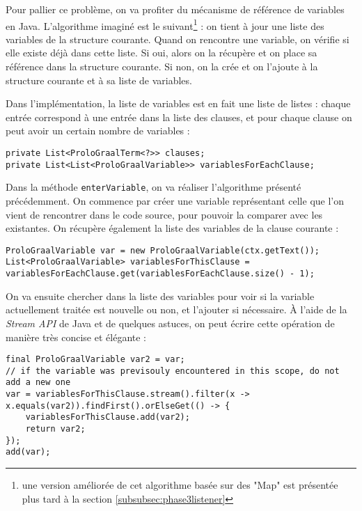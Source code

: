 \documentclass[../report.tex]{subfiles}
\begin{document}
Pour pallier ce problème, on va profiter du mécanisme de référence de variables en Java. L'algorithme imaginé est le suivant\footnote{une version améliorée de cet algorithme basée sur des "Map" est présentée plus tard à la section \ref{subsubsec:phase3listener}} : on tient à jour une liste des variables de la structure courante. Quand on rencontre une variable, on vérifie si elle existe déjà dans cette liste. Si oui, alors on la récupère et on place sa référence dans la structure courante. Si non, on la crée et on l'ajoute à la structure courante et à sa liste de variables.

Dans l'implémentation, la liste de variables est en fait une liste de listes : chaque entrée correspond à une entrée dans la liste des clauses, et pour chaque clause on peut avoir un certain nombre de variables :
\begin{verbatim}
private List<ProloGraalTerm<?>> clauses;
private List<List<ProloGraalVariable>> variablesForEachClause;
\end{verbatim}
Dans la méthode \texttt{enterVariable}, on va réaliser l'algorithme présenté précédemment. On commence par créer une variable représentant celle que l'on vient de rencontrer dans le code source, pour pouvoir la comparer avec les existantes. On récupère également la liste des variables de la clause courante :
\begin{verbatim}
ProloGraalVariable var = new ProloGraalVariable(ctx.getText());
List<ProloGraalVariable> variablesForThisClause = variablesForEachClause.get(variablesForEachClause.size() - 1);
\end{verbatim}
On va ensuite chercher dans la liste des variables pour voir si la variable actuellement traitée est nouvelle ou non, et l'ajouter si nécessaire. À l'aide de la \textit{Stream API} de Java et de quelques astuces, on peut écrire cette opération de manière très concise et élégante :
\begin{verbatim}
final ProloGraalVariable var2 = var;
// if the variable was previsouly encountered in this scope, do not add a new one
var = variablesForThisClause.stream().filter(x -> x.equals(var2)).findFirst().orElseGet(() -> {
    variablesForThisClause.add(var2);
    return var2;
});
add(var);
\end{verbatim}
\end{document}
